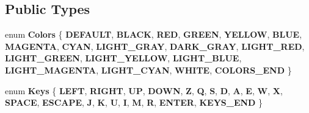 \subsection*{Public Types}
\begin{DoxyCompactItemize}
\item 
\mbox{\label{classArcade_1_1Display_1_1IDisplayModule_ae0a776be9163d096051c522e21c007b2}} 
enum {\bfseries Colors} \{ \newline
{\bfseries D\+E\+F\+A\+U\+LT}, 
{\bfseries B\+L\+A\+CK}, 
{\bfseries R\+ED}, 
{\bfseries G\+R\+E\+EN}, 
\newline
{\bfseries Y\+E\+L\+L\+OW}, 
{\bfseries B\+L\+UE}, 
{\bfseries M\+A\+G\+E\+N\+TA}, 
{\bfseries C\+Y\+AN}, 
\newline
{\bfseries L\+I\+G\+H\+T\+\_\+\+G\+R\+AY}, 
{\bfseries D\+A\+R\+K\+\_\+\+G\+R\+AY}, 
{\bfseries L\+I\+G\+H\+T\+\_\+\+R\+ED}, 
{\bfseries L\+I\+G\+H\+T\+\_\+\+G\+R\+E\+EN}, 
\newline
{\bfseries L\+I\+G\+H\+T\+\_\+\+Y\+E\+L\+L\+OW}, 
{\bfseries L\+I\+G\+H\+T\+\_\+\+B\+L\+UE}, 
{\bfseries L\+I\+G\+H\+T\+\_\+\+M\+A\+G\+E\+N\+TA}, 
{\bfseries L\+I\+G\+H\+T\+\_\+\+C\+Y\+AN}, 
\newline
{\bfseries W\+H\+I\+TE}, 
{\bfseries C\+O\+L\+O\+R\+S\+\_\+\+E\+ND}
 \}
\item 
\mbox{\label{classArcade_1_1Display_1_1IDisplayModule_a8da3f6b309ca0581473ae8cc8789b619}} 
enum {\bfseries Keys} \{ \newline
{\bfseries L\+E\+FT}, 
{\bfseries R\+I\+G\+HT}, 
{\bfseries UP}, 
{\bfseries D\+O\+WN}, 
\newline
{\bfseries Z}, 
{\bfseries Q}, 
{\bfseries S}, 
{\bfseries D}, 
\newline
{\bfseries A}, 
{\bfseries E}, 
{\bfseries W}, 
{\bfseries X}, 
\newline
{\bfseries S\+P\+A\+CE}, 
{\bfseries E\+S\+C\+A\+PE}, 
{\bfseries J}, 
{\bfseries K}, 
\newline
{\bfseries U}, 
{\bfseries I}, 
{\bfseries M}, 
{\bfseries R}, 
\newline
{\bfseries E\+N\+T\+ER}, 
{\bfseries K\+E\+Y\+S\+\_\+\+E\+ND}
 \}
\end{DoxyCompactItemize}
